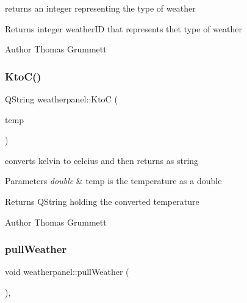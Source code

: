 returns an integer representing the type of weather 

\begin{DoxyReturn}{Returns}
integer weather\+ID that represents thet type of weather 
\end{DoxyReturn}
\begin{DoxyAuthor}{Author}
Thomas Grummett 
\end{DoxyAuthor}
\mbox{\label{classweatherpanel_aa060e2d25c499b202688fdb0ed2e51f0}} 
\subsubsection{\texorpdfstring{Kto\+C()}{KtoC()}}
{\footnotesize\ttfamily Q\+String weatherpanel\+::\+KtoC (\begin{DoxyParamCaption}\item[{double}]{temp }\end{DoxyParamCaption})\hspace{0.3cm}{\ttfamily [private]}}



converts kelvin to celcius and then returns as string 


\begin{DoxyParams}{Parameters}
{\em double} & temp is the temperature as a double \\
\hline
\end{DoxyParams}
\begin{DoxyReturn}{Returns}
Q\+String holding the converted temperature 
\end{DoxyReturn}
\begin{DoxyAuthor}{Author}
Thomas Grummett 
\end{DoxyAuthor}
\mbox{\label{classweatherpanel_a212139bb98a83e8c52b30bbe786b8bb1}} 
\subsubsection{\texorpdfstring{pull\+Weather}{pullWeather}}
{\footnotesize\ttfamily void weatherpanel\+::pull\+Weather (\begin{DoxyParamCaption}{ }\end{DoxyParamCaption})\hspace{0.3cm}{\ttfamily [private]}, {\ttfamily [slot]}}




